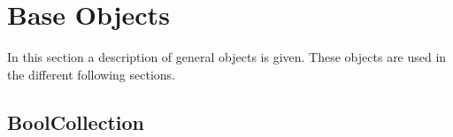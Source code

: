 \newpage\section{Base Objects}

In this section a description of general objects is given. These objects are used in the different following sections.




\subsection{BoolCollection}


